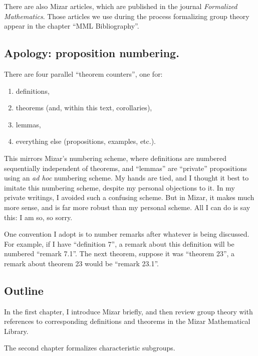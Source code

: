 There are also Mizar articles, which are published in the
journal \emph{Formalized Mathematics}. Those articles we use during the
process formalizing group theory appear in the chapter ``MML Bibliography''.

\subsection*{Apology: proposition numbering.} There are four parallel
``theorem counters'', one for:
\begin{enumerate}
\item definitions,
\item theorems (and, within this text, corollaries),
\item lemmas,
\item everything else (propositions, examples, etc.).
\end{enumerate}
This mirrors Mizar's numbering scheme, where definitions are numbered
sequentially independent of theorems, and ``lemmas'' are ``private''
propositions using an \emph{ad hoc} numbering scheme. My hands are tied,
and I thought it best to imitate this numbering scheme, despite my
personal objections to it. In my private writings, I avoided such a
confusing scheme. But in Mizar, it makes much more sense, and is far
more robust than my personal scheme. All I can do is say this: I am so,
so sorry.

One convention I adopt is to number remarks after whatever is being
discussed. For example, if I have ``definition 7'', a remark about this
definition will be numbered ``remark 7.1''. The next theorem, suppose it
was ``theorem 23'', a remark about theorem 23 would be ``remark 23.1''.

\subsection*{Outline}
In the first chapter, I introduce Mizar briefly, and then review group
theory with references to corresponding definitions and theorems in the
Mizar Mathematical Library.

The second chapter formalizes characteristic subgroups.


